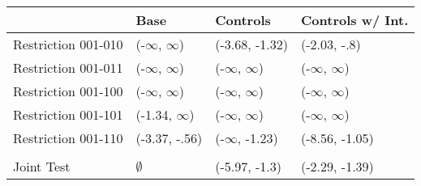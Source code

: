 \begin{tabular}{llll}
\toprule
{} &           Base &        Controls & Controls w/ Int. \\
\midrule
Restriction 001-010 &      (-$\infty$, $\infty$) &  (-3.68, -1.32) &     (-2.03, -.8) \\
Restriction 001-011 &      (-$\infty$, $\infty$) &       (-$\infty$, $\infty$) &        (-$\infty$, $\infty$) \\
Restriction 001-100 &      (-$\infty$, $\infty$) &       (-$\infty$, $\infty$) &        (-$\infty$, $\infty$) \\
Restriction 001-101 &    (-1.34, $\infty$) &       (-$\infty$, $\infty$) &        (-$\infty$, $\infty$) \\
Restriction 001-110 &  (-3.37, -.56) &    (-$\infty$, -1.23) &   (-8.56, -1.05) \\
\hline\\Joint Test  &         $\emptyset$ &   (-5.97, -1.3) &   (-2.29, -1.39) \\
\bottomrule
\end{tabular}
